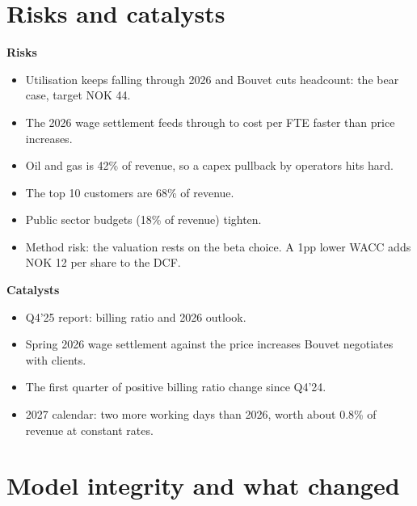 \documentclass[10pt,a4paper]{article}
\begin{document}
\section{Risks and catalysts}
\begin{minipage}[t]{0.49\textwidth}
\textbf{Risks}
\begin{itemize}
\item Utilisation keeps falling through 2026 and Bouvet cuts headcount: the bear case, target NOK 44.
\item The 2026 wage settlement feeds through to cost per FTE faster than price increases.
\item Oil and gas is 42\% of revenue, so a capex pullback by operators hits hard.
\item The top 10 customers are 68\% of revenue.
\item Public sector budgets (18\% of revenue) tighten.
\item Method risk: the valuation rests on the beta choice. A 1pp lower WACC adds NOK 12 per share to the DCF.
\end{itemize}
\end{minipage}\hfill
\begin{minipage}[t]{0.49\textwidth}
\textbf{Catalysts}
\begin{itemize}
\item Q4'25 report: billing ratio and 2026 outlook.
\item Spring 2026 wage settlement against the price increases Bouvet negotiates with clients.
\item The first quarter of positive billing ratio change since Q4'24.
\item 2027 calendar: two more working days than 2026, worth about 0.8\% of revenue at constant rates.
\end{itemize}
\end{minipage}

\section{Model integrity and what changed}
\end{document}
